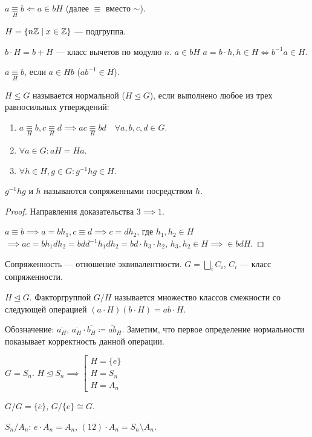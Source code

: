 \begin{definition}
    $a \underset{H}{\equiv} b \Leftarrow a \in bH$ (далее $\equiv$ вместо $\sim$).
\end{definition}
\begin{example}
   $H = \{ n\mathbb{Z} \mid x\in \mathbb{Z}\}$ --- подгруппа.

   $b \cdot H = b + H$ --- класс вычетов по модулю  $n$. $a \in bH$  $a = b\cdot h, h \in H \iff b^{-1}a \in H$.

   $a \underset{H}{\equiv}b$, если  $a \in Hb$ ($ab^{-1} \in H$).
\end{example}
\begin{definition}
    $H \le G$ называется нормальной ($H \trianglelefteq G$), если выполнено любое из трех равносильных утверждений:
    \begin{enumerate}
        \item $a \underset{H}{\equiv} b, c \underset{H}{\equiv} d \implies ac \underset{H}{\equiv} bd \quad \forall a,b,c,d \in G$.
        \item $\forall a \in G\!: aH=Ha$.
        \item  $\forall h \in H, g \in G\!: g^{-1}hg \in H$.
    \end{enumerate}
\end{definition}
\begin{definition}
    $g^{-1}hg$ и  $h$ называются сопряженными посредством  $h$.
\end{definition}
\begin{proof}
    Направления доказательства $3 \implies 1$.

     $a \equiv b \implies a = bh_1, c \equiv d \implies c = dh_2$, где $h_1, h_2 \in H$ $\implies ac = bh_1dh_2 = bdd^{-1}h_1dh_2 = bd \cdot h_3 \cdot h_2$, $h_3, h_2 \in H \implies \in bdH$.
\end{proof}
\begin{remark}
    Сопряженность --- отношение эквивалентности.
    $G = \bigsqcup\limits_i C_i$,  $C_i$ --- класс сопряженности.
\end{remark}
\begin{definition}
    $H \trianglelefteq G$. Факторгруппой  $G / H$ называется множество классов смежности со следующей операцией $(a\cdot H)(b\cdot H) = ab \cdot H$.

    Обозначение: $\overline{a_H}$,  $\overline{a_H} \cdot \overline{b_H} \coloneqq \overline{ab}_H$. Заметим, что первое определение нормальности показывает корректность данной операции.
\end{definition}
\begin{example}
    $G = S_n$.  $H \trianglelefteq S_n \implies \left[ \begin{array}{l} H = \{e\} \\ H = S_n \\ H = A_n \end{array} \right.$

     $G / G = \{ \overline{e} \}$,  $G / \{e\} \cong G$.

     $S_n / A_n$:  $e \cdot A_n = A_n$,  $(12) \cdot A_n = S_n \setminus A_n$.
\end{example}

